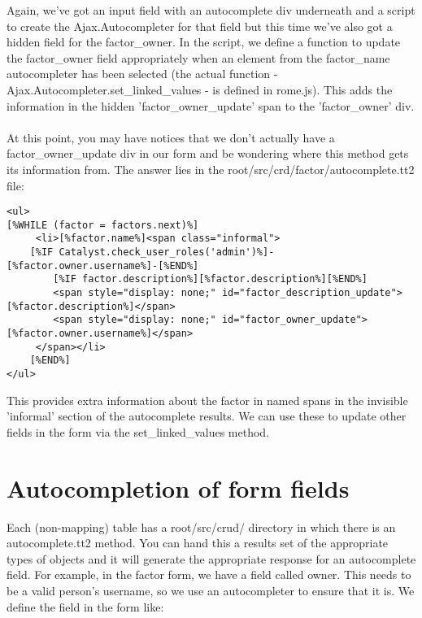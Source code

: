 Again, we've got an input field with an autocomplete div underneath and a script to create the Ajax.Autocompleter for that field but this time we've also got a hidden field for the factor\_owner. In the script, we define a function to update the factor\_owner field appropriately when an element from the factor\_name autocompleter has been selected (the actual function - Ajax.Autocompleter.set\_linked\_values - is defined in rome.js). This adds the information in the hidden 'factor\_owner\_update' span to the 'factor\_owner' div. 

\paragraph*{}
At this point, you may have notices that we don't actually have a factor\_owner\_update div in our form and be wondering where this method gets its information from. The answer lies in the root/src/crd/factor/autocomplete.tt2 file:

\begin{verbatim}
<ul>
[%WHILE (factor = factors.next)%]
     <li>[%factor.name%]<span class="informal">
	[%IF Catalyst.check_user_roles('admin')%]-[%factor.owner.username%]-[%END%]
        [%IF factor.description%][%factor.description%][%END%]
        <span style="display: none;" id="factor_description_update">[%factor.description%]</span>
        <span style="display: none;" id="factor_owner_update">[%factor.owner.username%]</span>
     </span></li>  
    [%END%]
</ul>
\end{verbatim}
 
This provides extra information about the factor in named spans in the invisible 'informal' section of the autocomplete results. We can use these to update other fields in the form via the set\_linked\_values method. 





\section{Autocompletion of form fields}
Each (non-mapping) table has a root/src/crud/ directory in which there is an autocomplete.tt2 method. You can hand this a results set of the appropriate types of objects and it will generate the appropriate response for an autocomplete field. For example, in the factor form, we have a field called owner. This needs to be a valid person's username, so we use an autocompleter to ensure that it is. We define the field in the form like:

